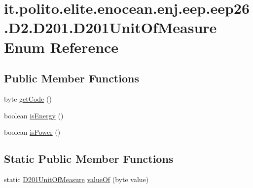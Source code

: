 \hypertarget{enumit_1_1polito_1_1elite_1_1enocean_1_1enj_1_1eep_1_1eep26_1_1_d2_1_1_d201_1_1_d201_unit_of_measure}{}\section{it.\+polito.\+elite.\+enocean.\+enj.\+eep.\+eep26.\+D2.\+D201.\+D201\+Unit\+Of\+Measure Enum Reference}
\label{enumit_1_1polito_1_1elite_1_1enocean_1_1enj_1_1eep_1_1eep26_1_1_d2_1_1_d201_1_1_d201_unit_of_measure}
\subsection*{Public Member Functions}
\begin{DoxyCompactItemize}
\item 
byte \hyperlink{enumit_1_1polito_1_1elite_1_1enocean_1_1enj_1_1eep_1_1eep26_1_1_d2_1_1_d201_1_1_d201_unit_of_measure_aff5365c4950a17c86234aca44f445236}{get\+Code} ()
\item 
boolean \hyperlink{enumit_1_1polito_1_1elite_1_1enocean_1_1enj_1_1eep_1_1eep26_1_1_d2_1_1_d201_1_1_d201_unit_of_measure_aafd3068de6ae9fcab72f7f4d7a0e525c}{is\+Energy} ()
\item 
boolean \hyperlink{enumit_1_1polito_1_1elite_1_1enocean_1_1enj_1_1eep_1_1eep26_1_1_d2_1_1_d201_1_1_d201_unit_of_measure_ae63a72411ea86bae01f76b26fa2dbe61}{is\+Power} ()
\end{DoxyCompactItemize}
\subsection*{Static Public Member Functions}
\begin{DoxyCompactItemize}
\item 
static \hyperlink{enumit_1_1polito_1_1elite_1_1enocean_1_1enj_1_1eep_1_1eep26_1_1_d2_1_1_d201_1_1_d201_unit_of_measure}{D201\+Unit\+Of\+Measure} \hyperlink{enumit_1_1polito_1_1elite_1_1enocean_1_1enj_1_1eep_1_1eep26_1_1_d2_1_1_d201_1_1_d201_unit_of_measure_a42b7e82d33ab09627547b1957c91636f}{value\+Of} (byte value)
\end{DoxyCompactItemize}
